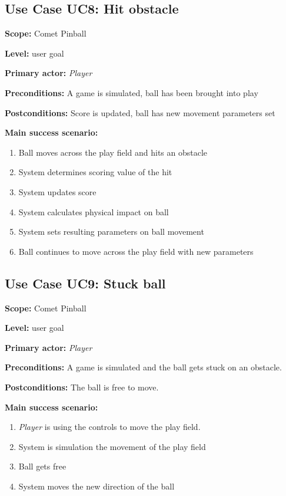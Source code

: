 \documentclass[fontsize=12pt,
               paper=a4,
               twoside=false,
               parskip=half,
               ]{scrartcl}
\begin{document}


\subsection{Use Case UC8: Hit obstacle}

\textbf{\textsf{Scope:}} Comet Pinball

\textbf{\textsf{Level:}} user goal

\textbf{\textsf{Primary actor:}} \emph{Player}

\textbf{\textsf{Preconditions:}} A game is simulated, ball has been brought into play

\textbf{\textsf{Postconditions:}} Score is updated, ball has new movement parameters set

\textbf{\textsf{Main success scenario:}}

\begin{enumerate}[leftmargin=3em]
	\item Ball moves across the play field and hits an obstacle
	\item System determines scoring value of the hit
	\item System updates score
	\item System calculates physical impact on ball
	\item System sets resulting parameters on ball movement
	\item Ball continues to move across the play field with new parameters
\end{enumerate}




\subsection{Use Case UC9: Stuck ball}

\textbf{\textsf{Scope:}} Comet Pinball

\textbf{\textsf{Level:}} user goal

\textbf{\textsf{Primary actor:}} \emph{Player}

\textbf{\textsf{Preconditions:}} A game is simulated and the ball gets stuck on an obstacle.

\textbf{\textsf{Postconditions:}} The ball is free to move.

\textbf{\textsf{Main success scenario:}}

\begin{enumerate}[leftmargin=3em]
	\item \emph{Player} is using the controls to move the play field.
	\item System is simulation the movement of the play field
	\item Ball gets free
	\item System moves the new direction of the ball
\end{enumerate}
\end{document}
